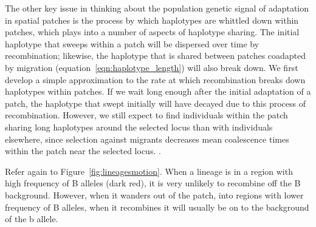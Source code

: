 \documentclass{article}
\begin{document}
The other key issue in thinking about the population genetic signal of adaptation in spatial patches 
is the process by which haplotypes are whittled down within patches, 
which plays into a number of aspects of haplotype sharing. 
The initial haplotype that sweeps within a patch 
will be dispersed over time by recombination;
likewise, the haplotype that is shared between patches coadapted by migration
(equation~\ref{eqn:haplotype_length}) will also break down. 
We first develop a simple approximation to the rate 
at which recombination breaks down haplotypes within patches. 
If we wait long enough after the initial adaptation of a patch,
the haplotype that swept initially will have decayed due to this process of recombination. 
However, we still expect to find individuals within the patch sharing long haplotypes around the selected locus
than with individuals elsewhere,
since selection against migrants 
decreases mean coalescence times within the patch near the selected locus.
\citep{bartonpaper,charlesworths}. 

Refer again to Figure~\ref{fig:lineagesmotion}. 
When a lineage is in a region with high frequency of B alleles (dark red), 
it is very unlikely to recombine off the B background. 
However, when it wanders out of the patch,
into regions with lower frequency of B alleles,
when it recombines it will
usually be on to the background of the b allele.
\end{document}
